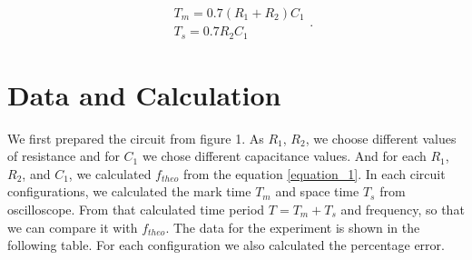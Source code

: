 \documentclass{scrartcl}
\begin{document}
\begin{equation*}
	\begin{split}
		&T_m = 0.7 (R_1 + R_2) C_1 \\
		&T_s = 0.7 R_2 C_1
	\end{split}.
\end{equation*}


\section{Data and Calculation}
We first prepared the circuit from figure 1. As $R_1$, $R_2$, we choose different values of resistance and for $C_1$ we chose different capacitance values. And for each $R_1$, $R_2$, and $C_1$, we calculated $f_{theo}$ from the equation \eqref{equation_1}. In each circuit configurations, we calculated the mark time $T_m$ and space time $T_s$ from oscilloscope. From that calculated time period $T= T_m + T_s$ and frequency, so that we can compare it with $f_{theo}$. The data for the experiment is shown in the following table. For each configuration we also calculated the percentage error.
\end{document}
